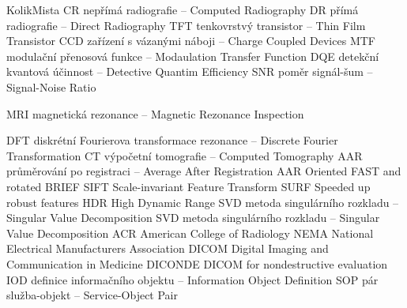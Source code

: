 \begin{seznamzkratek}{KolikMista}
			{CR}
			{nepřímá radiografie -- Computed Radiography}
			{DR}
			{přímá radiografie -- Direct Radiography}
			{TFT}
			{tenkovrstvý transistor -- Thin Film Transistor}
			{CCD}
			{zařízení s vázanými náboji -- Charge Coupled Devices}
			{MTF}
			{modulační přenosová funkce -- Modaulation Transfer Function}
			{DQE}
			{detekční kvantová účinnost -- Detective Quantim Efficiency}
			{SNR}
			{poměr signál-šum -- Signal-Noise Ratio}

			{MRI}
			{magnetická rezonance -- Magnetic Rezonance Inspection}
			
			{DFT}
			{diskrétní Fourierova transformace rezonance -- Discrete Fourier Transformation}
			{CT}
			{výpočetní tomografie -- Computed Tomography}
			{AAR}
			{průměrování po registraci -- Average After Registration}
			{AAR}
			{Oriented FAST and rotated BRIEF}
			{SIFT}
			{Scale-invariant Feature Transform}
			{SURF}
			{Speeded up robust features}
			{HDR}
			{High Dynamic Range}
			{SVD}
			{metoda singulárního rozkladu -- Singular Value Decomposition}
			{SVD}
			{metoda singulárního rozkladu -- Singular Value Decomposition}
			{ACR}
			{American College of Radiology}	
			{NEMA}
			{National Electrical Manufacturers Association}			
			{DICOM}
			{Digital Imaging and Communication in Medicine}
			{DICONDE}
			{DICOM for nondestructive evaluation}
			{IOD}
			{definice informačního objektu -- Information Object Definition}
			{SOP}
			{pár služba-objekt -- Service-Object Pair}				
\end{seznamzkratek}
